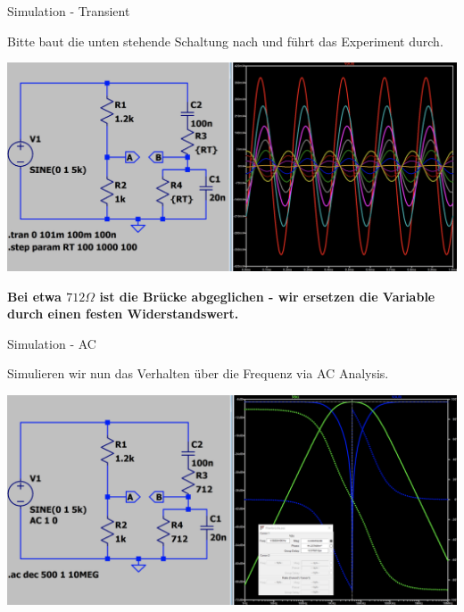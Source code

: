 \begin{frame}[t]{Simulation - Transient}

  Bitte baut die unten stehende Schaltung nach und führt das Experiment durch.

  \begin{spacing}{0.9} \begin{tiny}
      \begin{minipage}{\textwidth}
        \includegraphics[width=0.75\linewidth]{pictures/wheatstone_simulation.png}
      \end{minipage}
    \end{tiny} \end{spacing}

  \textbf{Bei etwa $712\Omega$ ist die Brücke abgeglichen - wir ersetzen die Variable durch einen festen Widerstandswert.}

\end{frame}

\begin{frame}[t]{Simulation - AC}

  Simulieren wir nun das Verhalten über die Frequenz via AC Analysis.

  \begin{spacing}{0.9} \begin{tiny}
      \begin{minipage}{\textwidth}
        \includegraphics[width=0.75\linewidth]{pictures/wheatstone_ac.png}
      \end{minipage}
    \end{tiny} \end{spacing}

\end{frame}

